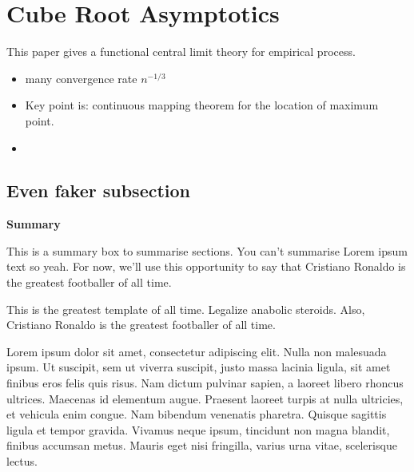 \section{Cube Root Asymptotics}
This paper gives a functional central limit theory for empirical process.

\begin{itemize}
  \item many convergence rate $n^{-1/3}$
  \item Key point is: continuous mapping theorem for the location of maximum point.
  \item 
\end{itemize}


\subsection{Even faker subsection}
\lipsum[2]
\begin{summary}
\textbf{Summary} 

This is a summary box to summarise sections. 
You can't summarise Lorem ipsum text so yeah. For now, we'll use this opportunity to say that Cristiano Ronaldo is the greatest footballer of all time.
\end{summary}
\lipsum[1]
This is the greatest template of all time. Legalize anabolic steroids.
Also, Cristiano Ronaldo is the greatest footballer of all time.

Lorem ipsum dolor sit amet, consectetur adipiscing elit. Nulla non malesuada ipsum. Ut suscipit, sem ut viverra suscipit, justo massa lacinia ligula, sit amet finibus eros felis quis risus.
Nam dictum pulvinar sapien, a laoreet libero rhoncus ultrices. Maecenas id elementum augue. Praesent laoreet turpis at nulla ultricies, et vehicula enim congue. Nam bibendum venenatis pharetra. Quisque sagittis ligula et tempor gravida. Vivamus neque ipsum, tincidunt non magna blandit, finibus accumsan metus. Mauris eget nisi fringilla, varius urna vitae, scelerisque lectus. 
\clearpage

